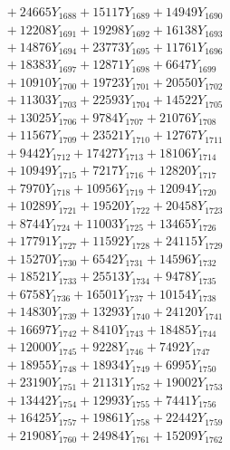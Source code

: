 \documentclass[a4paper,10pt]{article}
\begin{document}
{\begin{align}
&\;  + 24665 Y_{1688} + 15117 Y_{1689} + 14949 Y_{1690} \\[0.3ex]
&\;  + 12208 Y_{1691} + 19298 Y_{1692} + 16138 Y_{1693} \\[0.3ex]
&\;  + 14876 Y_{1694} + 23773 Y_{1695} + 11761 Y_{1696} \\[0.3ex]
&\;  + 18383 Y_{1697} + 12871 Y_{1698} + 6647 Y_{1699} \\[0.3ex]
&\;  + 10910 Y_{1700} + 19723 Y_{1701} + 20550 Y_{1702} \\[0.3ex]
&\;  + 11303 Y_{1703} + 22593 Y_{1704} + 14522 Y_{1705} \\[0.3ex]
&\;  + 13025 Y_{1706} + 9784 Y_{1707} + 21076 Y_{1708} \\[0.5ex]\allowbreak
&\;  + 11567 Y_{1709} + 23521 Y_{1710} + 12767 Y_{1711} \\[0.3ex]
&\;  + 9442 Y_{1712} + 17427 Y_{1713} + 18106 Y_{1714} \\[0.3ex]
&\;  + 10949 Y_{1715} + 7217 Y_{1716} + 12820 Y_{1717} \\[0.3ex]
&\;  + 7970 Y_{1718} + 10956 Y_{1719} + 12094 Y_{1720} \\[0.3ex]
&\;  + 10289 Y_{1721} + 19520 Y_{1722} + 20458 Y_{1723} \\[0.3ex]
&\;  + 8744 Y_{1724} + 11003 Y_{1725} + 13465 Y_{1726} \\[0.3ex]
&\;  + 17791 Y_{1727} + 11592 Y_{1728} + 24115 Y_{1729} \\[0.3ex]
&\;  + 15270 Y_{1730} + 6542 Y_{1731} + 14596 Y_{1732} \\[0.3ex]
&\;  + 18521 Y_{1733} + 25513 Y_{1734} + 9478 Y_{1735} \\[0.3ex]
&\;  + 6758 Y_{1736} + 16501 Y_{1737} + 10154 Y_{1738} \\[0.5ex]\allowbreak
&\;  + 14830 Y_{1739} + 13293 Y_{1740} + 24120 Y_{1741} \\[0.3ex]
&\;  + 16697 Y_{1742} + 8410 Y_{1743} + 18485 Y_{1744} \\[0.3ex]
&\;  + 12000 Y_{1745} + 9228 Y_{1746} + 7492 Y_{1747} \\[0.3ex]
&\;  + 18955 Y_{1748} + 18934 Y_{1749} + 6995 Y_{1750} \\[0.3ex]
&\;  + 23190 Y_{1751} + 21131 Y_{1752} + 19002 Y_{1753} \\[0.3ex]
&\;  + 13442 Y_{1754} + 12993 Y_{1755} + 7441 Y_{1756} \\[0.3ex]
&\;  + 16425 Y_{1757} + 19861 Y_{1758} + 22442 Y_{1759} \\[0.3ex]
&\;  + 21908 Y_{1760} + 24984 Y_{1761} + 15209 Y_{1762} \\[0.3ex]

\end{align}}
\end{document}
